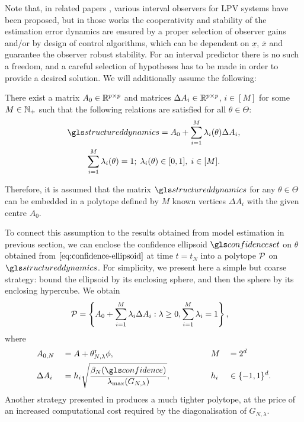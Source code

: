 Note that, in related papers \citep{AitRami2008,RVZ10,Bolajraf2011,Efimov_a2013,Efimov_tac2013,Chebotarev2015}, various interval observers for \gls{LPV} systems have been proposed, but in those works the cooperativity and stability of the estimation error dynamics are ensured by a proper selection of observer gains and/or by design of control algorithms, which can be dependent on $\underline{x}$, $\overline{x}$ and guarantee the observer robust stability. For an interval predictor there is no such a freedom, and a careful selection of hypotheses has to be made in order to provide a desired solution.
We will additionally assume the following:
\begin{assumption}
	\label{assumpt:polytope}
	\begin{leftbar}[assumptionbar]
	There exist a matrix $A_{0}\in\mathbb{R}^{p\times p}$ and matrices $\Delta A_{i}\in\mathbb{R}^{p\times p}$, $i\in[M]$ for some $M\in\mathbb{N}_{+}$ such that the following relations are satisfied for all $\theta\in\Theta$:
	\begin{gather*}
	\structureddynamics=A_{0}+\sum_{i=1}^{M}\lambda_{i}(\theta)\Delta A_{i},\\
	\sum_{i=1}^{M}\lambda_{i}(\theta)=1;\;\lambda_{i}(\theta)\in[0,1],\;i\in[M].
	\end{gather*}
	\end{leftbar}
\end{assumption}
Therefore, it is assumed that the matrix $\structureddynamics$ for any $\theta\in\Theta$ can be embedded in a polytope defined by $M$ known vertices $\Delta A_{i}$ with the given centre $A_{0}$. 

To connect this assumption to the results obtained from model estimation in previous section, we can enclose the confidence ellipsoid $\confidenceset$ on $\theta$ obtained from $\eqref{eq:confidence-ellipsoid}$ at time $t=t_N$ into a polytope $\mathcal{P}$ on $\structureddynamics$. For simplicity, we present here a simple but coarse strategy: bound the ellipsoid by its enclosing sphere, and then the sphere by its enclosing hypercube. We obtain
\begin{align}
\label{eq:polytope}
&\mathcal{P} = \left\{ A_{0}+\sum_{i=1}^{M}\lambda_{i}\Delta A_{i}: \lambda\geq 0,  \sum_{i=1}^{M}\lambda_{i}=1\right\},
\end{align}
where 
\begin{alignat*}{4}
&A_{0,N}&&=A + \theta_{N,\lambda}^\transp\phi, & \hspace{4em}
&M &&= 2^d\\
&\Delta A_{i}&&={h_i} \sqrt{\frac{\beta_N(\confidence)}{\lambda_{\max}(G_{N,\lambda})}},& 
&h_i&&\in\{-1,1\}^d.
\end{alignat*}
Another strategy presented in  produces a much tighter polytope, at the price of an increased computational cost required by the diagonalisation of $G_{N,\lambda}$.

